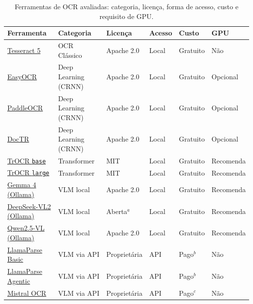 \documentclass[
  12pt,
  oneside,
  a4paper,
  chapter=TITLE,
  section=TITLE,
  english,
  brazil
]{abntex2}
\begin{document}
\begin{table}[H]
\centering
\caption{Ferramentas de OCR avaliadas: categoria, licença, forma de acesso, custo e
requisito de GPU.}
\label{tab:ferramentas_fund}
\renewcommand{\arraystretch}{1.3}
\begin{tabular}{p{2.3cm} p{2.8cm} p{2cm} p{1.2cm} p{1.8cm} p{2cm}}
\hline
\textbf{Ferramenta} & \textbf{Categoria} & \textbf{Licença} & \textbf{Acesso}
  & \textbf{Custo} & \textbf{GPU} \\
\hline
\href{https://github.com/tesseract-ocr/tesseract}{Tesseract 5}
  & OCR Clássico         & Apache 2.0   & Local & Gratuito  & Não \\
\hline
\href{https://github.com/JaidedAI/EasyOCR}{EasyOCR}
  & Deep Learning (CRNN) & Apache 2.0   & Local & Gratuito  & Opcional \\
\href{https://github.com/PaddlePaddle/PaddleOCR}{PaddleOCR}
  & Deep Learning (CRNN) & Apache 2.0   & Local & Gratuito  & Opcional \\
\href{https://github.com/mindee/doctr}{DocTR}
  & Deep Learning (CRNN) & Apache 2.0   & Local & Gratuito  & Opcional \\
\hline
\href{https://huggingface.co/microsoft/trocr-base-handwritten}{TrOCR \texttt{base}}
  & Transformer          & MIT          & Local & Gratuito  & Recomenda \\
\href{https://huggingface.co/microsoft/trocr-large-handwritten}{TrOCR \texttt{large}}
  & Transformer          & MIT          & Local & Gratuito  & Recomenda \\
\hline
\href{https://ai.google.dev/gemma/docs/core}{Gemma 4 (Ollama)}
  & VLM local            & Apache 2.0   & Local & Gratuito  & Recomenda \\
\href{https://github.com/deepseek-ai/DeepSeek-VL2}{DeepSeek-VL2 (Ollama)}
  & VLM local            & Aberta$^{a}$ & Local & Gratuito  & Recomenda \\
\href{https://github.com/QwenLM/Qwen2.5-VL}{Qwen2.5-VL (Ollama)}
  & VLM local            & Apache 2.0   & Local & Gratuito  & Recomenda \\
\hline
\href{https://www.llamaindex.ai/llamaparse}{LlamaParse Basic}
  & VLM via API          & Proprietária & API   & Pago$^{b}$ & Não \\
\href{https://www.llamaindex.ai/llamaparse}{LlamaParse Agentic}
  & VLM via API          & Proprietária & API   & Pago$^{b}$ & Não \\
\href{https://mistral.ai/news/mistral-ocr}{Mistral OCR}
  & VLM via API          & Proprietária & API   & Pago$^{c}$ & Não \\

\end{tabular}
\end{table}
\end{document}
